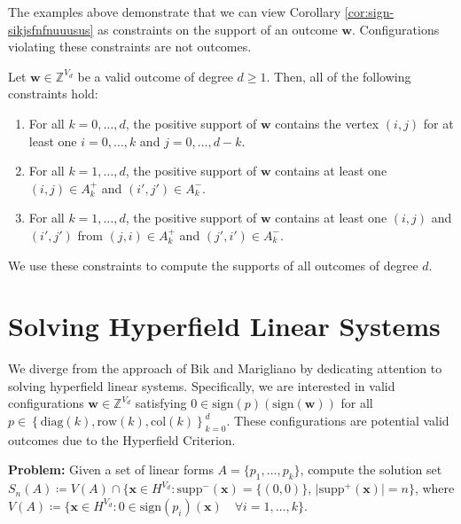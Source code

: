 The examples above demonstrate that we can view Corollary \ref{cor:sign-sikjsfnfnuuusus} as constraints on the support of an outcome \( \mathbf{w} \). Configurations violating these constraints are not outcomes.

\begin{corollary}\label{cor:sdnfksjnjkwnrw3r}
    Let \( \mathbf{w} \in \mathbb{Z}^{V_d} \) be a valid outcome of degree \( d \geq 1 \). Then, all of the following constraints hold:
    \begin{enumerate}
        \item For all \( k = 0, \dots, d \), the positive support of \( \mathbf{w} \) contains the vertex \( (i,j) \) for at least one \( i = 0, \dots, k \) and \( j = 0, \dots, d - k \).
        \item For all \( k = 1, \dots, d \), the positive support of \( \mathbf{w} \) contains at least one \( (i,j) \in A_k^+ \) and \( (i',j') \in A_k^- \).
        \item For all \( k = 1, \dots, d \), the positive support of \( \mathbf{w} \) contains at least one \( (i,j) \) and \( (i',j') \) from \( (j,i) \in A_k^+ \) and \( (j',i') \in A_k^- \).
    \end{enumerate}
\end{corollary}

We use these constraints to compute the supports of all outcomes of degree \( d \).

\section{Solving Hyperfield Linear Systems}

We diverge from the approach of Bik and Marigliano by dedicating attention to solving hyperfield linear systems. Specifically, we are interested in valid configurations \( \mathbf{w} \in \mathbb{Z}^{V_d} \) satisfying \( 0 \in \mathrm{sign}(p)(\mathrm{sign}(\mathbf{w})) \)
for all \( p \in \left\{ \mathrm{diag}(k), \mathrm{row}(k), \mathrm{col}(k) \right\}_{k=0}^d \). These configurations are potential valid outcomes due to the Hyperfield Criterion.

\vspace{0.3cm}

\noindent \textbf{Problem:} Given a set of linear forms $A = \{ p_{1}, \dots, p_{k} \}$, compute the solution set $S_{n}(A) \coloneqq V(A) \cap \{ \mathbf{x} \in H^{V_{d}} : \text{$\mathrm{supp}^-(\mathbf{x}) = \{ (0,0) \}$, $\vert \mathrm{supp}^+(\mathbf{x}) \vert = n$} \}$, where $V(A) \coloneqq \{ \mathbf{x} \in H^{V_{d}} : 0 \in \mathrm{sign}(p_{i})(\mathbf{x})  \quad \forall i = 1, \dots, k \}$.


